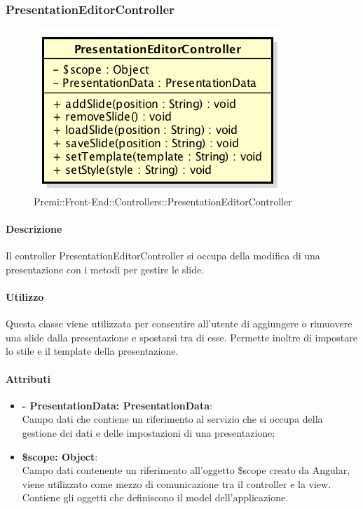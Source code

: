 \subsubsection{PresentationEditorController}
\begin{figure}[h]
	\centering
	\includegraphics[width=0.5\linewidth]{img/premi_front_end_controllers_presentationeditorcontroller}
	\caption[Premi::Front-End::Controllers::PresentationEditorController]{Premi::Front-End::Controllers::PresentationEditorController}
\end{figure}

	\paragraph{Descrizione}
	Il controller PresentationEditorController si occupa della modifica di una presentazione con i metodi per gestire le slide.
	
	\paragraph{Utilizzo}
	Questa classe viene utilizzata per consentire all'utente di aggiungere o rimuovere una slide dalla presentazione e spostarsi tra di esse. Permette inoltre di impostare lo stile e il template della presentazione.
	
	\paragraph{Attributi}
	\begin{itemize}
		\item \textbf{- PresentationData: PresentationData}:\\
				Campo dati che contiene un riferimento al servizio che si occupa della gestione dei dati e delle impostazioni di una presentazione;
		\item \textbf{\$scope: Object}:\\
				Campo dati contenente un riferimento all'oggetto \$scope creato da Angular, viene utilizzato come mezzo di comunicazione tra il controller e la view. Contiene gli oggetti che definiscono il model dell'applicazione.
	\end{itemize}
	
